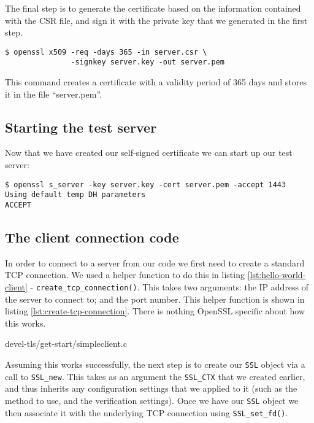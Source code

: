 The final step is to generate the certificate based on the information 
contained with the CSR file, and sign it with the private key that we generated 
in the first step.

\begin{verbatim}
$ openssl x509 -req -days 365 -in server.csr \
               -signkey server.key -out server.pem
\end{verbatim}

This command creates a certificate with a validity period of 365 days and 
stores it in the file ``server.pem''.

\subsection{Starting the test server}
\label{sec:start-test-server}

Now that we have created our self-signed certificate we can start up our test 
server:

\begin{verbatim}
$ openssl s_server -key server.key -cert server.pem -accept 1443
Using default temp DH parameters
ACCEPT
\end{verbatim}

\subsection{The client connection code}

In order to connect to a server from our code we first need to create a standard
TCP connection. We used a helper function to do this in listing
\ref{lst:hello-world-client} - \verb!create_tcp_connection()!. This takes two
arguments: the IP address of the server to connect to; and the port number. This
helper function is shown in listing \ref{lst:create-tcp-connection}. There is 
nothing OpenSSL specific about how this works.


{devel-tls/get-start/simpleclient.c}

Assuming this works successfully, the next step is to create our \verb!SSL! 
object via a call to \verb!SSL_new!. This takes as an argument the 
\verb!SSL_CTX! that we created earlier, and thus inherits any configuration 
settings that we applied to it (such as the method to use, and the verification 
settings). Once we have our \verb!SSL! object we then associate it with the 
underlying TCP connection using \verb!SSL_set_fd()!.


